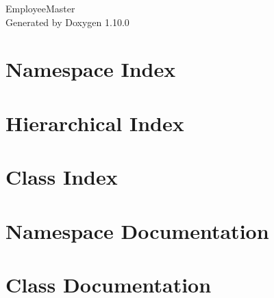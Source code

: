 \documentclass[twoside]{book}
\newcommand{\+}{\discretionary{\mbox{\scriptsize$\hookleftarrow$}}{}{}}
\newcommand{\clearemptydoublepage}{%
    \newpage{\pagestyle{empty}\cleardoublepage}%
  }
\begin{document}
  \raggedbottom
    \hypersetup{pageanchor=false,
                bookmarksnumbered=true,
                pdfencoding=unicode
               }
  \begin{titlepage}
  \vspace*{7cm}
  \begin{center}%
  {\Large Employee\+Master}\\
  \vspace*{1cm}
  {\large Generated by Doxygen 1.10.0}\\
  \end{center}
  \end{titlepage}
  \clearemptydoublepage
  \tableofcontents
  \clearemptydoublepage
  \hypersetup{pageanchor=true}
\chapter{Namespace Index}

\chapter{Hierarchical Index}

\chapter{Class Index}

\chapter{Namespace Documentation}




\chapter{Class Documentation}






  \backmatter
  \newpage
  \clearemptydoublepage
  \printindex
\end{document}
